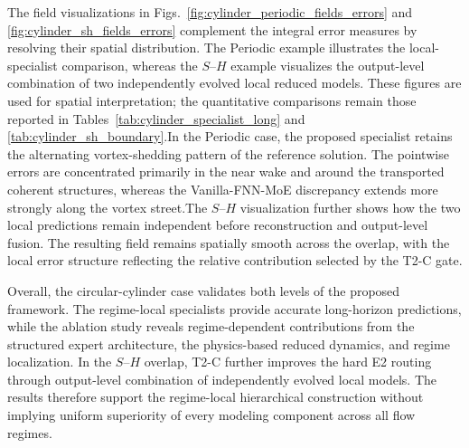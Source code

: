 The field visualizations in
Figs.~\ref{fig:cylinder_periodic_fields_errors} and
\ref{fig:cylinder_sh_fields_errors} complement the integral error measures
by resolving their spatial distribution. The Periodic example illustrates
the local-specialist comparison, whereas the $S$--$H$ example visualizes the
output-level combination of two independently evolved local reduced models.
These figures are used for spatial interpretation; the quantitative
comparisons remain those reported in
Tables~\ref{tab:cylinder_specialist_long} and
\ref{tab:cylinder_sh_boundary}.In the Periodic case, the proposed specialist retains the alternating
vortex-shedding pattern of the reference solution. The pointwise errors are
concentrated primarily in the near wake and around the transported coherent
structures, whereas the Vanilla-FNN-MoE discrepancy extends more strongly
along the vortex street.The $S$--$H$ visualization further shows how the two local predictions remain
independent before reconstruction and output-level fusion. The resulting
field remains spatially smooth across the overlap, with the local error
structure reflecting the relative contribution selected by the T2-C gate.







Overall, the circular-cylinder case validates both levels of the proposed
framework. The regime-local specialists provide accurate long-horizon
predictions, while the ablation study reveals regime-dependent contributions
from the structured expert architecture, the physics-based reduced dynamics,
and regime localization. In the $S$--$H$ overlap, T2-C further improves the
hard E2 routing through output-level combination of independently evolved
local models. The results therefore support the regime-local hierarchical
construction without implying uniform superiority of every modeling component
across all flow regimes.
